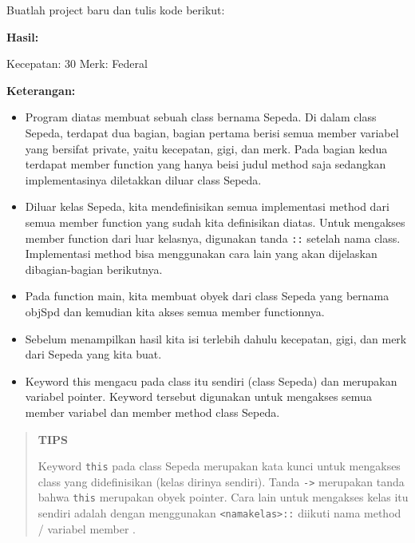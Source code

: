 Buatlah project baru dan tulis kode berikut:



\textbf{Hasil:}

\begin{lcverbatim}
Kecepatan: 30 Merk: Federal
\end{lcverbatim}

\textbf{Keterangan:}

\begin{itemize}

\item
 Program diatas membuat sebuah class bernama Sepeda. Di dalam class
 Sepeda, terdapat dua bagian, bagian pertama berisi semua member
 variabel yang bersifat private, yaitu kecepatan, gigi, dan merk. Pada
 bagian kedua terdapat member function yang hanya beisi judul method
 saja sedangkan implementasinya diletakkan diluar class Sepeda.
\item
 Diluar kelas Sepeda, kita mendefinisikan semua implementasi method
 dari semua member function yang sudah kita definisikan diatas. Untuk
 mengakses member function dari luar kelasnya, digunakan tanda
 \texttt{::} setelah nama class. Implementasi method bisa menggunakan
 cara lain yang akan dijelaskan dibagian-bagian berikutnya.
\item
 Pada function main, kita membuat obyek dari class Sepeda yang bernama
 objSpd dan kemudian kita akses semua member functionnya.
\item
 Sebelum menampilkan hasil kita isi terlebih dahulu kecepatan, gigi,
 dan merk dari Sepeda yang kita buat.
\item
 Keyword this mengacu pada class itu sendiri (class Sepeda) dan
 merupakan variabel pointer. Keyword tersebut digunakan untuk mengakses
 semua member variabel dan member method class Sepeda.
\end{itemize}
\begin{quotation}
{\LARGE {}} \textbf{TIPS}

	Keyword
	\texttt{this} pada class Sepeda merupakan kata kunci untuk mengakses
	class yang didefinisikan (kelas dirinya sendiri). Tanda
	\texttt{-\textgreater{}} merupakan tanda bahwa \texttt{this} merupakan
	obyek pointer. Cara lain untuk mengakses kelas itu sendiri adalah dengan
	menggunakan \texttt{\textless{}namakelas\textgreater{}::} diikuti nama
	method / variabel member .
\end{quotation}




